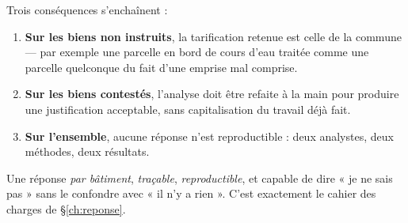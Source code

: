 Trois conséquences s'enchaînent :

\begin{enumerate}
  \item \textbf{Sur les biens non instruits}, la tarification retenue est celle
    de la commune — par exemple une parcelle en bord de cours d'eau traitée
    comme une parcelle quelconque du fait d'une emprise mal comprise.
  \item \textbf{Sur les biens contestés}, l'analyse doit être refaite à la main
    pour produire une justification acceptable, sans capitalisation du travail
    déjà fait.
  \item \textbf{Sur l'ensemble}, aucune réponse n'est reproductible : deux
    analystes, deux méthodes, deux résultats.
\end{enumerate}

\begin{encadre}[title={Ce que la réponse doit donc garantir}]
Une réponse \emph{par bâtiment}, \emph{traçable}, \emph{reproductible}, et
capable de dire « je ne sais pas » sans le confondre avec « il n'y a rien ».
C'est exactement le cahier des charges de \S\ref{ch:reponse}.
\end{encadre}
